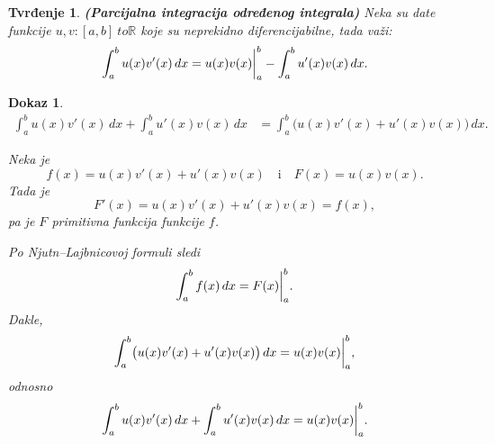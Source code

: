 \documentclass[11pt]{article}
\newcommand{\gr}[2]{%
  \mathchoice
    {\bigg|_{#1}^{#2}}%
    {\big|_{#1}^{#2}}%
    {\scriptstyle|_{#1}^{#2}}%
    {\scriptscriptstyle|_{#1}^{#2}}%
}
\newcounter{mathitem}
\theoremstyle{plain}
\newtheorem{tvrdjenje}[mathitem]{Tvrđenje}
\theoremstyle{serbnodot}
\newtheorem*{dokaz}{Dokaz}
\begin{document}
\begin{tvrdjenje}
\textbf{(Parcijalna integracija određenog integrala)}
Neka su date funkcije \(u, v: [a, b] \ to \mathbb{R}\) koje su neprekidno diferencijabilne, tada važi:
\[
  \int_{a}^{b} u(x)v'(x) \, dx = u(x)v(x)\gr{a}{b} - \int_{a}^{b}u'(x)v(x) \,dx.
\]
\end{tvrdjenje}

\begin{dokaz}
\begin{align*}
\int_a^b u(x)v'(x)\,dx + \int_a^b u'(x)v(x)\,dx
  &= \int_a^b \bigl(u(x)v'(x)+u'(x)v(x)\bigr)\,dx.
\end{align*}

Neka je
\[
f(x)=u(x)v'(x)+u'(x)v(x)
\quad \text{i} \quad
F(x)=u(x)v(x).
\]
Tada je
\[
F'(x)=u(x)v'(x)+u'(x)v(x)=f(x),
\]
pa je \(F\) primitivna funkcija funkcije \(f\).

Po Njutn--Lajbnicovoj formuli sledi
\[
\int_a^b f(x)\,dx = F(x)\gr{a}{b}.
\]
Dakle,
\[
\int_a^b \bigl(u(x)v'(x)+u'(x)v(x)\bigr)\,dx = u(x)v(x)\gr{a}{b},
\]
odnosno
\[
\int_a^b u(x)v'(x)\,dx + \int_a^b u'(x)v(x)\,dx = u(x)v(x)\gr{a}{b}.
\]
\end{dokaz}
\end{document}
